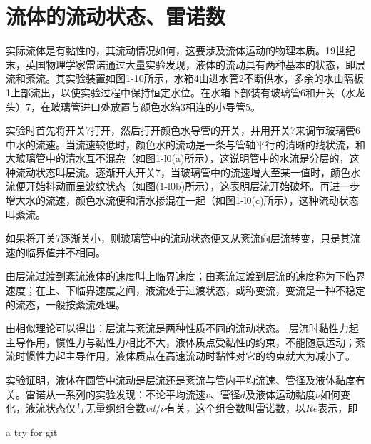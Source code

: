 \section{流体的流动状态、雷诺数}
实际流体是有黏性的，其流动情况如何，这要涉及流体运动的物理本质。19世纪末，英国物理学家雷诺通过大量实验发现，液体的流动具有两种基本的状态，即层流和紊流。其实验装置如图1-10所示，水箱4由进水管2不断供水，多余的水由隔板1上部流出，以使实验过程中保持恒定水位。在水箱下部装有玻璃管6和开关（水龙头）7，在玻璃管进口处放置与颜色水箱3相连的小导管5。

实验时首先将开关7打开，然后打开颜色水导管的开关，并用开关7来调节玻璃管6中水的流速。当流速较低时，颜色水的流动是一条与管轴平行的清晰的线状流，和大玻璃管中的清水互不混杂（如图1-l0(a)所示），这说明管中的水流是分层的，这种流动状态叫层流。逐渐开大开关7，当玻璃管中的流速增大至某一值时，颜色水流便开始抖动而呈波纹状态（如图(1-l0b)所示），这表明层流开始破坏。再进一步增大水的流速，颜色水流便和清水掺混在一起（如图1-l0(c)所示），这种流动状态叫紊流。

如果将开关7逐渐关小，则玻璃管中的流动状态便又从紊流向层流转变，只是其流速的临界值并不相同。

由层流过渡到紊流液体的速度叫上临界速度；由紊流过渡到层流的速度称为下临界速度；在上、下临界速度之间，液流处于过渡状态，或称变流，变流是一种不稳定的流态，一般按紊流处理。

由相似理论可以得出：层流与紊流是两种性质不同的流动状态。 层流时黏性力起主导作用，惯性力与黏性力相比不大，液体质点受黏性的约束，不能随意运动；紊流时惯性力起主导作用，液体质点在高速流动时黏性对它的约束就大为减小了。

实验证明，液体在圆管中流动是层流还是紊流与管内平均流速、管径及液体黏度有关。雷诺从一系列的实验发现：不论平均流速$v$、管径$d$及液体运动黏度$\nu $如何变化，液流状态仅与无量纲组合数$vd/\nu $有关，这个组合数叫雷诺数，以$Re$表示，即

a try for git
